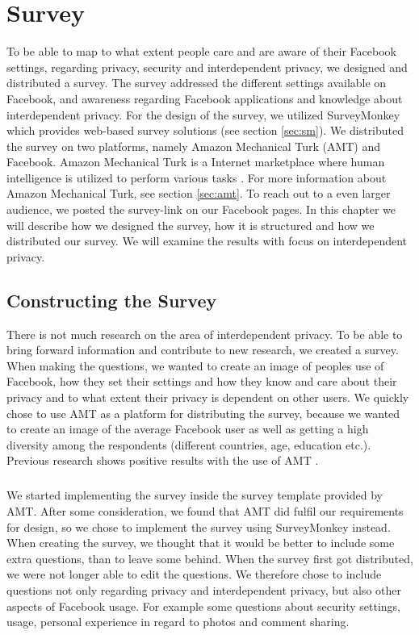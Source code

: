 \chapter{Survey}
\label{chp:amtsurvey} 

To be able to map to what extent people care and are aware of their Facebook settings, regarding privacy, security and interdependent privacy, we designed and distributed a survey. The survey addressed the different settings available on Facebook, and awareness regarding Facebook applications and knowledge about interdependent privacy. For the design of the survey, we utilized SurveyMonkey which provides web-based survey solutions (see section \ref{sec:sm}). We distributed the survey on two platforms, namely Amazon Mechanical Turk (AMT) and Facebook. Amazon Mechanical Turk is a Internet marketplace where human intelligence is utilized to perform various tasks \cite{amazonweb}. For more information about Amazon Mechanical Turk, see section \ref{sec:amt}. To reach out to a even larger audience, we posted the survey-link on our Facebook pages. In this chapter we will describe how we designed the survey, how it is structured and how we distributed our survey. We will examine the results with focus on interdependent privacy. 


\section{Constructing the Survey}
There is not much research on the area of interdependent privacy. To be able to bring forward information and contribute to new research, we created a survey. When making the questions, we wanted to create an image of peoples use of Facebook, how they set their settings and how they know and care about their privacy and to what extent their privacy is dependent on other users. We quickly chose to use AMT as a platform for distributing the survey, because we wanted to create an image of the average Facebook user as well as getting a high diversity among the respondents (different countries, age, education etc.). Previous research shows positive results with the use of AMT \cite{expectations,incentivesAmt}. 

\paragraph{}
We started implementing the survey inside the survey template provided by AMT. After some consideration, we found that AMT did fulfil our requirements for design, so we chose to implement the survey using SurveyMonkey instead. When creating the survey, we thought that it would be better to include some extra questions, than to leave some behind. When the survey first got distributed, we were not longer able to edit the questions. We therefore chose to include questions not only regarding privacy and interdependent privacy, but also other aspects of Facebook usage. For example some questions about security settings, usage, personal experience in regard to photos and comment sharing.

